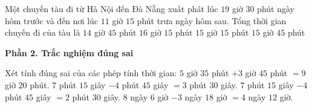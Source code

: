 \begin{ex} %
Một chuyến tàu đi từ Hà Nội đến Đà Nẵng xuất phát lúc $19$ giờ $30$ phút ngày hôm trước và đến nơi lúc $11$ giờ $15$ phút trưa ngày hôm sau. Tổng thời gian chuyến đi của tàu là
\choice
{$14$ giờ $45$ phút}
{$16$ giờ $15$ phút}
{$15$ giờ $15$ phút}
{\True $15$ giờ $45$ phút}
\end{ex}

\textbf{Phần 2. Trắc nghiệm đúng sai}

\begin{ex} %
Xét tính đúng sai của các phép tính thời gian:
\choiceTF
{\True $5$ giờ $35$ phút $+ 3$ giờ $45$ phút $= 9$ giờ $20$ phút.}
{$7$ phút $15$ giây $- 4$ phút $45$ giây $= 3$ phút $30$ giây.}
{\True $7$ phút $15$ giây $- 4$ phút $45$ giây $= 2$ phút $30$ giây.}
{\True $8$ ngày $6$ giờ $- 3$ ngày $18$ giờ $= 4$ ngày $12$ giờ.}
\end{ex}

